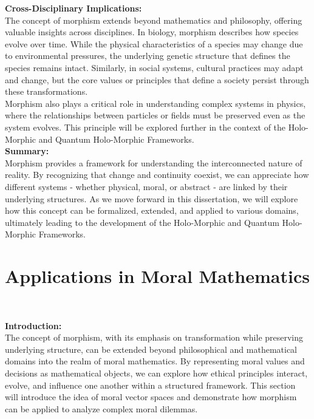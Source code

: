 \documentclass{article}
\begin{document}
\textbf{Cross-Disciplinary Implications:}
\\

The concept of morphism extends beyond mathematics and philosophy, offering valuable insights across disciplines. In biology, morphism describes how species evolve over time. While the physical characteristics of a species may change due to environmental pressures, the underlying genetic structure that defines the species remains intact. Similarly, in social systems, cultural practices may adapt and change, but the core values or principles that define a society persist through these transformations.
\\

Morphism also plays a critical role in understanding complex systems in physics, where the relationships between particles or fields must be preserved even as the system evolves. This principle will be explored further in the context of the Holo-Morphic and Quantum Holo-Morphic Frameworks.
\\

\textbf{Summary:}
\\

Morphism provides a framework for understanding the interconnected nature of reality. By recognizing that change and continuity coexist, we can appreciate how different systems - whether physical, moral, or abstract - are linked by their underlying structures. As we move forward in this dissertation, we will explore how this concept can be formalized, extended, and applied to various domains, ultimately leading to the development of the Holo-Morphic and Quantum Holo-Morphic Frameworks.
\\

\section*{	Applications in Moral Mathematics}
\

\textbf{Introduction:}
\\

The concept of morphism, with its emphasis on transformation while preserving underlying structure, can be extended beyond philosophical and mathematical domains into the realm of moral mathematics. By representing moral values and decisions as mathematical objects, we can explore how ethical principles interact, evolve, and influence one another within a structured framework. This section will introduce the idea of moral vector spaces and demonstrate how morphism can be applied to analyze complex moral dilemmas.
\\
\end{document}
